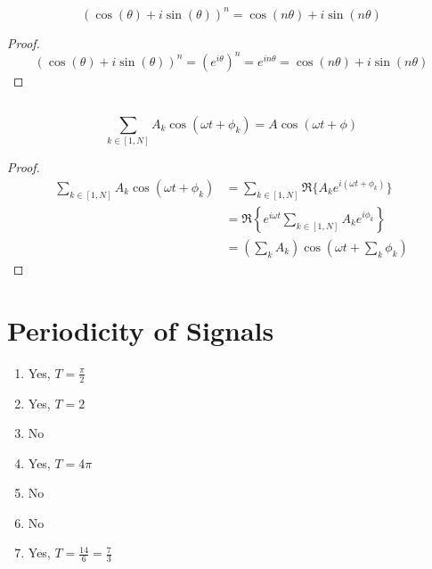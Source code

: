 \documentclass{article}
\begin{document}
\begin{theorem}
    \begin{equation}
        (\cos(\theta) + i \sin(\theta))^n = \cos(n \theta) + i \sin(n \theta)
    \end{equation}
\end{theorem}
\begin{proof}
    \begin{equation} 
        (\cos(\theta) + i \sin(\theta))^n = (e^{i \theta})^n = e^{i n \theta} = \cos(n \theta) + i \sin(n \theta)
    \end{equation}
\end{proof}

\subsection{}

\begin{theorem}
    \begin{equation}
        \sum_{k \in [1, N]} A_k \cos(\omega t + \phi_k) = A \cos(\omega t + \phi)
    \end{equation}
\end{theorem}
\begin{proof}
    \begin{align}
        \sum_{k \in [1, N]} A_k \cos(\omega t + \phi_k) &= \sum_{k \in [1, N]} \Re\{A_k e^{i (\omega t + \phi_k)}\} \\
        &= \Re\left\{e^{i \omega t} \sum_{k \in [1, N]} A_k e^{i \phi_k}\right\} \\
        &= \left(\sum_k A_k\right) \cos\left(\omega t + \sum_k \phi_k\right)
    \end{align}
\end{proof}

\section{Periodicity of Signals}

\begin{enumerate}
    \item Yes, \(T = \frac{\pi}{2}\)
    \item Yes, \(T = 2\)
    \item No
    \item Yes, \(T = 4 \pi\)
    \item No
    \item No
    \item Yes, \(T = \frac{14}{6} = \frac{7}{3}\)
\end{enumerate}
\end{document}
